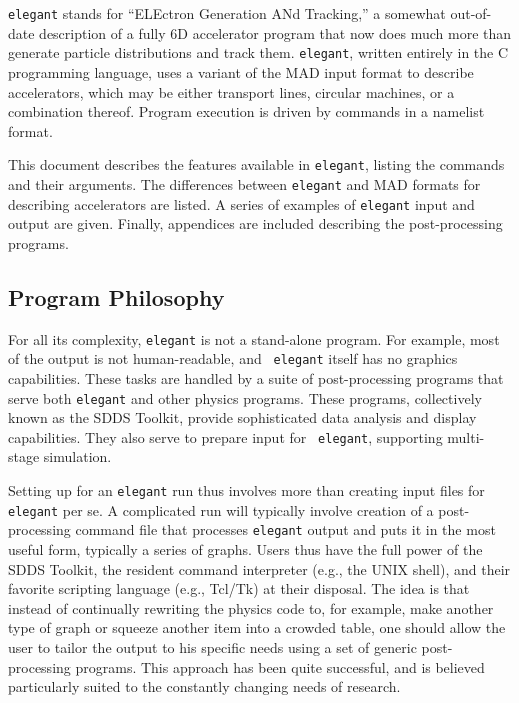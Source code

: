 \documentclass[11pt]{article}
\begin{document}
{\tt elegant} stands for ``ELEctron Generation ANd Tracking,'' a
somewhat out-of-date description of a fully 6D accelerator program
that now does much more than generate particle distributions and track
them.  {\tt elegant}, written entirely in the C programming
language\cite{Kernighan}, uses a variant of the MAD\cite{MAD} input
format to describe accelerators, which may be either transport lines,
circular machines, or a combination thereof.  Program execution is
driven by commands in a namelist format.

This document describes the features available in {\tt elegant},
listing the commands and their arguments.  The differences between
{\tt elegant} and MAD formats for describing accelerators are listed.
A series of examples of {\tt elegant} input and output are given.
Finally, appendices are included describing the post-processing
programs.

\subsection{Program Philosophy}

For all its complexity, {\tt elegant} is not a stand-alone program.
For example, most of the output is not human-readable, and {\tt
elegant} itself has no graphics capabilities.  These tasks are handled
by a suite of post-processing programs that serve both {\tt elegant}
and other physics programs.  These programs, collectively known as the
SDDS Toolkit\cite{SDDS1,SDDS2}, provide sophisticated data analysis
and display capabilities.  They also serve to prepare input for {\tt
elegant}, supporting multi-stage simulation.

Setting up for an {\tt elegant} run thus involves more than creating
input files for {\tt elegant} per se.  A complicated run will
typically involve creation of a post-processing command file that
processes {\tt elegant} output and puts it in the most useful form,
typically a series of graphs.  Users thus have the full power of the
SDDS Toolkit, the resident command interpreter (e.g., the UNIX shell),
and their favorite scripting language (e.g., Tcl/Tk) at their
disposal. The idea is that instead of continually rewriting the
physics code to, for example, make another type of graph or squeeze
another item into a crowded table, one should allow the user to tailor
the output to his specific needs using a set of generic
post-processing programs.  This approach has been quite successful,
and is believed particularly suited to the constantly changing needs
of research.
\end{document}
